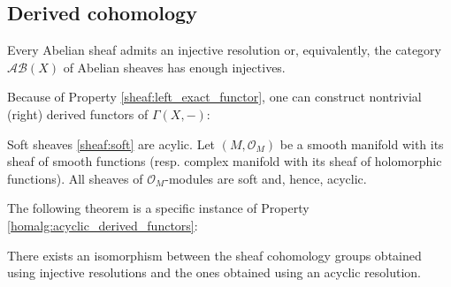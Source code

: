 
\subsection{Derived cohomology}

    \begin{property}
        Every Abelian sheaf admits an injective resolution or, equivalently, the category $\mathcal{AB}(X)$ of Abelian sheaves has enough injectives.
    \end{property}

    Because of Property \ref{sheaf:left_exact_functor}, one can construct nontrivial (right) derived functors of $\Gamma(X,-)$:

    \begin{example}\label{sheaf:example_soft}
        Soft sheaves \ref{sheaf:soft} are acylic. Let $(M,\mathcal{O}_M)$ be a smooth manifold with its sheaf of smooth functions (resp. complex manifold with its sheaf of holomorphic functions). All sheaves of $\mathcal{O}_M$-modules are soft and, hence, acyclic.
    \end{example}

    The following theorem is a specific instance of Property \ref{homalg:acyclic_derived_functors}:
    \begin{theorem}
        There exists an isomorphism between the sheaf cohomology groups obtained using injective resolutions and the ones obtained using an acyclic resolution.
    \end{theorem}

